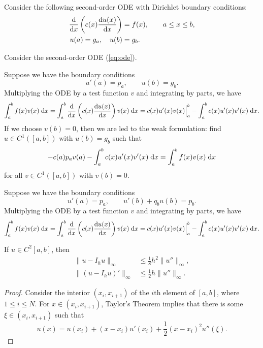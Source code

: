 \documentclass{homework}
\begin{document}
	\maketitle
	
	Consider the following second-order ODE with Dirichlet boundary conditions:
	\begin{align}
		\label{eq:ode}
		\frac{\text{d} {}}{\text{d} {x}}\left(c(x)\frac{\text{d} {u(x)}}{\text{d} {x}}\right) &= f(x),\qquad a \le x \le b, \\
		\label{eq:bc}
		u(a) = g_a,\quad u(b) &= g_b.
	\end{align}
	
	\question
	Consider the second-order ODE (\ref{eq:ode}).
	
	\begin{alphaparts}
		\questionpart Suppose we have the boundary conditions
		\begin{equation}
			u'(a) = p_a, \qquad u(b) = g_b.
		\end{equation}
		Multiplying the ODE by a test function $v$ and integrating by parts, we have
		\begin{equation}
			\int_a^b f(x)v(x)\;\text{d} x = \int_a^b \frac{\text{d} {}}{\text{d} {x}}\left(c(x)\frac{\text{d} {u(x)}}{\text{d} {x}}\right) v(x)\;\text{d} x = c(x)u'(x)v(x)\Big\vert_a^b - \int_a^b c(x)u'(x)v'(x)\;\text{d} x.
		\end{equation}
		If we choose $v(b) = 0$, then we are led to the weak formulation: find $u \in C^1([a,b])$ with $u(b) = g_b$ such that 
		\begin{equation}
			-c(a)p_av(a) - \int_a^b c(x)u'(x)v'(x)\;\text{d} x = \int_a^b f(x)v(x)\;\text{d} x
		\end{equation}
		for all $v \in C^1([a,b])$ with $v(b) = 0$.
		
		\questionpart Suppose we have the boundary conditions
		\begin{equation}
			u'(a) = p_a, \qquad u'(b) + q_b u(b) = p_b.
		\end{equation}
		Multiplying the ODE by a test function $v$ and integrating by parts, we have
		\begin{equation}
			\int_a^b f(x)v(x)\;\text{d} x = \int_a^b \frac{\text{d} {}}{\text{d} {x}}\left(c(x)\frac{\text{d} {u(x)}}{\text{d} {x}}\right) v(x)\;\text{d} x = c(x)u'(x)v(x)\Big\vert_a^b - \int_a^b c(x)u'(x)v'(x)\;\text{d} x.
		\end{equation}
	\end{alphaparts}
	
	\question
	
	\question
	If $u \in C^2[a,b]$, then
	\begin{align}
		\lVert u - I_hu\rVert_\infty &\le \frac{1}{8}h^2\lVert u'' \rVert_\infty,\\
		\lVert (u - I_hu)'\rVert_\infty &\le \frac{1}{2}h\lVert u''\rVert_\infty.
	\end{align}
	\begin{proof}
		Consider the interior $(x_i, x_{i+1})$ of the $i$th element of $[a,b]$, where $1 \le i\le N$. For $x \in (x_i, x_{i+1})$, Taylor's Theorem implies that there is some $\xi \in (x_i, x_{i+1})$ such that
		\begin{equation}
			u(x) = u(x_i) + (x-x_i)u'(x_i) + \frac{1}{2}(x-x_i)^2u''(\xi).
		\end{equation}
	\end{proof}
\end{document}

